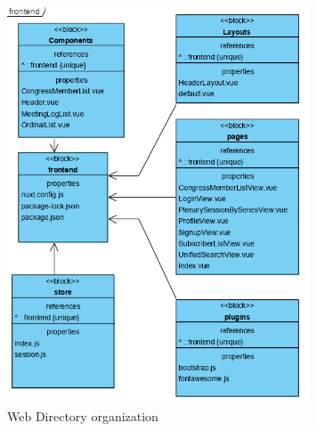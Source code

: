 \documentclass[conference]{IEEEtran}
\begin{document}
\begin{figure}[htbp]
\centerline{\includegraphics[width=90mm,scale=0.5]{fig/6_5.png}}
\caption{Web Directory organization}
\label{fig}
\end{figure}
\end{document}
